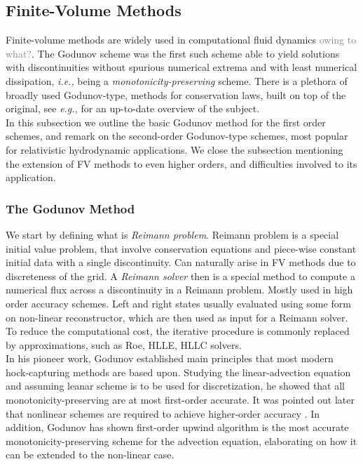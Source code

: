 \documentclass[11pt,a4paper,headinclude=true,DIV=14,BCOR=8mm,chapterprefix,listof=totoc,twoside,openright,abstracton]{scrbook}
\newcommand{\gray}[1]{\textcolor{gray}{#1}}
\begin{document}

\subsection{Finite-Volume Methods}

Finite-volume methods are widely used in computational fluid dynamics \gray{owing to what?}. The Godunov scheme \cite{Godunov:1959} was the first such scheme able to yield solutions with discontinuities without spurious numerical extrema and with least numerical dissipation, \textit{i.e.,} being a \textit{monotonicity-preserving} scheme. There is a plethora of broadly used Godunov-type, methods for conservation laws, built on top of the original, see \textit{e.g.,} \cite{Toro:1999} for an up-to-date overview of the subject. \\

In this subsection we outline the basic Godunov method for the first order schemes, and remark on the second-order Godunov-type schemes, most popular for relativistic hydrodynamic applications. We close the subsection mentioning the extension of FV methods to even higher orders, and difficulties involved to its application.\\


\subsubsection{The Godunov Method}

We start by defining what is \textit{Reimann problem}. Reimann problem is a special initial value problem, that involve conservation equations and piece-wise constant initial data with a single discontinuity. Can naturally arise in FV methods due to discreteness of the grid. A \textit{Reimann solver} then is a special method to compute a numerical flux across a discontinuity in a Reimann problem. Mostly used in high order accuracy schemes. Left and right states usually evaluated using some form on non-linear reconstructor, which are then used as input for a Reimann solver. To reduce the computational cost, the iterative procedure is commonly replaced by approximations, such as Roe, HLLE, HLLC solvers. \\

In his pioneer work, Godunov \cite{Godunov:1959} established main principles that most modern hock-capturing methods are based upon. Studying the linear-advection equation and assuming leanar scheme is to be used for discretization, he showed that all monotonicity-preserving are at most first-order accurate. It was pointed out later that nonlinear schemes are required to achieve higher-order accuracy \cite{Boris:1971,vanLeer:1973}. In addition, Godunov has shown first-order upwind algorithm is the most accurate monotonicity-preserving scheme for the advection equation, elaborating on how it can be extended to the non-linear case. \\
\end{document}
